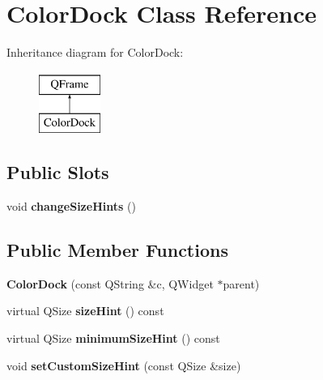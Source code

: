 \hypertarget{class_color_dock}{\section{Color\-Dock Class Reference}
\label{class_color_dock}
}
Inheritance diagram for Color\-Dock\-:\begin{figure}[H]
\begin{center}
\leavevmode
\includegraphics[height=2.000000cm]{class_color_dock}
\end{center}
\end{figure}
\subsection*{Public Slots}
\begin{DoxyCompactItemize}
\item 
\hypertarget{class_color_dock_af2659c6d290c1326e1757a787f047509}{void {\bfseries change\-Size\-Hints} ()}\label{class_color_dock_af2659c6d290c1326e1757a787f047509}

\end{DoxyCompactItemize}
\subsection*{Public Member Functions}
\begin{DoxyCompactItemize}
\item 
\hypertarget{class_color_dock_a178888e49538d53e7c4331ed0c0b4e52}{{\bfseries Color\-Dock} (const Q\-String \&c, Q\-Widget $\ast$parent)}\label{class_color_dock_a178888e49538d53e7c4331ed0c0b4e52}

\item 
\hypertarget{class_color_dock_a116198e960d54f2393f4f1b14a3e2162}{virtual Q\-Size {\bfseries size\-Hint} () const }\label{class_color_dock_a116198e960d54f2393f4f1b14a3e2162}

\item 
\hypertarget{class_color_dock_aef209e5c9adcf99664c07c65633c83e6}{virtual Q\-Size {\bfseries minimum\-Size\-Hint} () const }\label{class_color_dock_aef209e5c9adcf99664c07c65633c83e6}

\item 
\hypertarget{class_color_dock_a94da7c005c8f0454038dd4534cba5a25}{void {\bfseries set\-Custom\-Size\-Hint} (const Q\-Size \&size)}\label{class_color_dock_a94da7c005c8f0454038dd4534cba5a25}

\end{DoxyCompactItemize}
